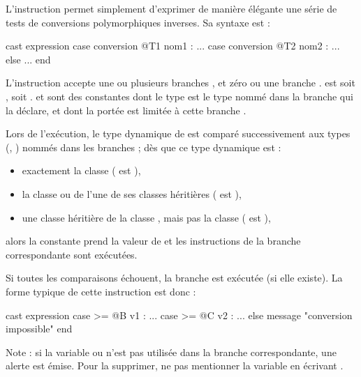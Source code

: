 
L'instruction  permet simplement d'exprimer de manière élégante une série de tests de conversions polymorphiques inverses. Sa syntaxe est :

\begin{galgascode}
cast expression
case conversion @T1 nom1 :
  ...
case conversion @T2 nom2 :
  ...
else
  ...
end
\end{galgascode}

L'instruction accepte une ou plusieurs branches , et zéro ou une branche .  est soit \galgas{==}, soit \galgas{>=}.  et  sont des constantes dont le type est le type nommé dans la branche  qui la déclare, et dont la portée est limitée à cette branche .

Lors de l'exécution, le type dynamique de  est comparé successivement aux types (, ) nommés dans les branches  ; dès que ce type dynamique est :
\begin{itemize}
  \item exactement la classe  ( est \galgas{==}), 
  \item la classe  ou de l'une de ses classes héritières ( est \galgas{>=}),
  \item une classe héritière de la classe , mais pas la classe  ( est \galgas{>}),
\end{itemize}
alors la constante prend la valeur de  et les instructions de la branche correspondante sont exécutées.

Si toutes les comparaisons échouent, la branche  est exécutée (si elle existe). La forme typique de cette instruction est donc :


\begin{galgascode}
cast expression
case >= @B v1 :
  ...
case >= @C v2 :
  ...
else
  message "conversion impossible"
end
\end{galgascode}

Note : si la variable  ou   n'est pas utilisée dans la branche correspondante, une alerte est émise. Pour la supprimer, ne pas mentionner la variable en écrivant .









